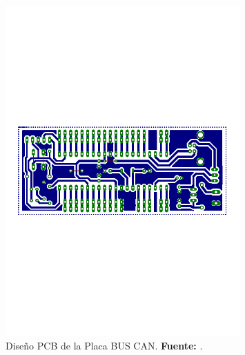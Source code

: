 \begin{figure}[H]
	\centering
		\includegraphics[trim = 5mm 53mm 5mm 50mm, clip, width=0.8\textwidth]{./Cap4imagen/CanPcb8.pdf}
	\caption[Diseño PCB de la Placa BUS CAN.]{Diseño PCB de la Placa BUS CAN.\textbf{ Fuente:} \cite{Tu}.}
	\label{Esch5} %
\end{figure}



